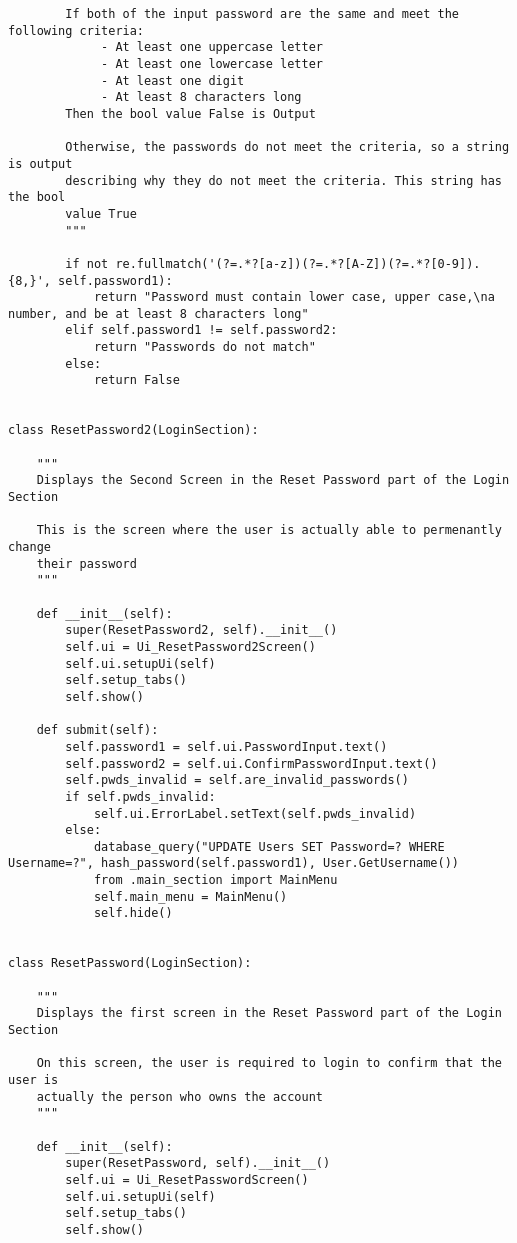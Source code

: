 \documentclass{article}
\begin{document}
\begin{lstlisting}
        If both of the input password are the same and meet the following criteria:
             - At least one uppercase letter
             - At least one lowercase letter
             - At least one digit
             - At least 8 characters long
        Then the bool value False is Output

        Otherwise, the passwords do not meet the criteria, so a string is output
        describing why they do not meet the criteria. This string has the bool
        value True
        """

        if not re.fullmatch('(?=.*?[a-z])(?=.*?[A-Z])(?=.*?[0-9]).{8,}', self.password1):
            return "Password must contain lower case, upper case,\na number, and be at least 8 characters long"
        elif self.password1 != self.password2:
            return "Passwords do not match"
        else:
            return False


class ResetPassword2(LoginSection):

    """
    Displays the Second Screen in the Reset Password part of the Login Section

    This is the screen where the user is actually able to permenantly change
    their password
    """

    def __init__(self):
        super(ResetPassword2, self).__init__()
        self.ui = Ui_ResetPassword2Screen()
        self.ui.setupUi(self)
        self.setup_tabs()
        self.show()

    def submit(self):
        self.password1 = self.ui.PasswordInput.text()
        self.password2 = self.ui.ConfirmPasswordInput.text()
        self.pwds_invalid = self.are_invalid_passwords()
        if self.pwds_invalid:
            self.ui.ErrorLabel.setText(self.pwds_invalid)
        else:
            database_query("UPDATE Users SET Password=? WHERE Username=?", hash_password(self.password1), User.GetUsername())
            from .main_section import MainMenu
            self.main_menu = MainMenu()
            self.hide()


class ResetPassword(LoginSection):

    """
    Displays the first screen in the Reset Password part of the Login Section

    On this screen, the user is required to login to confirm that the user is
    actually the person who owns the account
    """

    def __init__(self):
        super(ResetPassword, self).__init__()
        self.ui = Ui_ResetPasswordScreen()
        self.ui.setupUi(self)
        self.setup_tabs()
        self.show()


\end{lstlisting}
\end{document}
